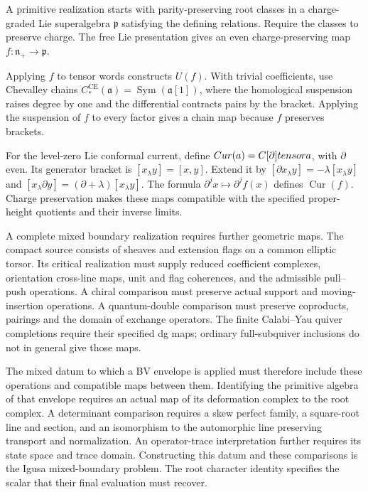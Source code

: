 A primitive realization starts with parity-preserving root classes in a charge-graded Lie superalgebra $\mathfrak p$ satisfying the defining relations. Require the classes to preserve charge. The free Lie presentation gives an even charge-preserving map $f:\mathfrak n_+\to\mathfrak p$.

Applying $f$ to tensor words constructs $U(f)$. With trivial coefficients, use Chevalley chains $C_*^{\mathrm{CE}}(\mathfrak a)=\operatorname{Sym}(\mathfrak a[1])$, where the homological suspension raises degree by one and the differential contracts pairs by the bracket. Applying the suspension of $f$ to every factor gives a chain map because $f$ preserves brackets.

For the level-zero Lie conformal current, define $Cur(a)=C[\partial]tensora$, with $\partial$ even. Its generator bracket is $[x_\lambda y]=[x,y]$. Extend it by $[\partial x_\lambda y]=-\lambda[x_\lambda y]$ and $[x_\lambda\partial y]=(\partial+\lambda)[x_\lambda y]$. The formula $\partial^j x\mapsto\partial^j f(x)$ defines $\operatorname{Cur}(f)$. Charge preservation makes these maps compatible with the specified proper-height quotients and their inverse limits.

A complete mixed boundary realization requires further geometric maps.
The compact source consists of sheaves and extension flags on a common
elliptic torsor. Its critical realization must supply reduced coefficient
complexes, orientation cross-line maps, unit and flag coherences, and the
admissible pull--push operations. A chiral comparison must preserve actual
support and moving-insertion operations. A quantum-double comparison must
preserve coproducts, pairings and the domain of exchange operators.
The finite Calabi--Yau quiver completions require their specified dg maps;
ordinary full-subquiver inclusions do not in general give those maps.

The mixed datum to which a BV envelope is applied must therefore include
these operations and compatible maps between them. Identifying the
primitive algebra of that envelope requires an actual map of its
deformation complex to the root complex. A determinant comparison requires
a skew perfect family, a square-root line and section, and an isomorphism
to the automorphic line preserving transport and normalization.
An operator-trace interpretation further requires its state space and
trace domain. Constructing this datum and these comparisons is the Igusa
mixed-boundary problem. The root character identity specifies the scalar
that their final evaluation must recover.

